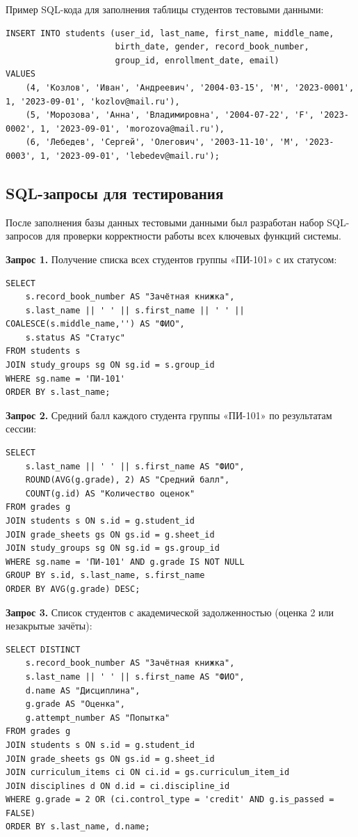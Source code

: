 \documentclass[14pt, a4paper]{extreport}
\begin{document}
Пример SQL-кода для заполнения таблицы студентов тестовыми данными:
\begin{lstlisting}[caption={Заполнение таблицы students тестовыми данными}]
INSERT INTO students (user_id, last_name, first_name, middle_name, 
                      birth_date, gender, record_book_number, 
                      group_id, enrollment_date, email)
VALUES 
    (4, 'Козлов', 'Иван', 'Андреевич', '2004-03-15', 'M', '2023-0001', 1, '2023-09-01', 'kozlov@mail.ru'),
    (5, 'Морозова', 'Анна', 'Владимировна', '2004-07-22', 'F', '2023-0002', 1, '2023-09-01', 'morozova@mail.ru'),
    (6, 'Лебедев', 'Сергей', 'Олегович', '2003-11-10', 'M', '2023-0003', 1, '2023-09-01', 'lebedev@mail.ru');
\end{lstlisting}

\subsection{SQL-запросы для тестирования}
После заполнения базы данных тестовыми данными был разработан набор SQL-запросов для проверки корректности работы всех ключевых функций системы.

\textbf{Запрос 1.} Получение списка всех студентов группы «ПИ-101» с их статусом:
\begin{lstlisting}[caption={Запрос 1: Список студентов группы}]
SELECT 
    s.record_book_number AS "Зачётная книжка",
    s.last_name || ' ' || s.first_name || ' ' || COALESCE(s.middle_name,'') AS "ФИО",
    s.status AS "Статус"
FROM students s
JOIN study_groups sg ON sg.id = s.group_id
WHERE sg.name = 'ПИ-101'
ORDER BY s.last_name;
\end{lstlisting}

\textbf{Запрос 2.} Средний балл каждого студента группы «ПИ-101» по результатам сессии:
\begin{lstlisting}[caption={Запрос 2: Средний балл студентов}]
SELECT 
    s.last_name || ' ' || s.first_name AS "ФИО",
    ROUND(AVG(g.grade), 2) AS "Средний балл",
    COUNT(g.id) AS "Количество оценок"
FROM grades g
JOIN students s ON s.id = g.student_id
JOIN grade_sheets gs ON gs.id = g.sheet_id
JOIN study_groups sg ON sg.id = gs.group_id
WHERE sg.name = 'ПИ-101' AND g.grade IS NOT NULL
GROUP BY s.id, s.last_name, s.first_name
ORDER BY AVG(g.grade) DESC;
\end{lstlisting}

\textbf{Запрос 3.} Список студентов с академической задолженностью (оценка 2 или незакрытые зачёты):
\begin{lstlisting}[caption={Запрос 3: Академическая задолженность}]
SELECT DISTINCT 
    s.record_book_number AS "Зачётная книжка",
    s.last_name || ' ' || s.first_name AS "ФИО",
    d.name AS "Дисциплина",
    g.grade AS "Оценка",
    g.attempt_number AS "Попытка"
FROM grades g
JOIN students s ON s.id = g.student_id
JOIN grade_sheets gs ON gs.id = g.sheet_id
JOIN curriculum_items ci ON ci.id = gs.curriculum_item_id
JOIN disciplines d ON d.id = ci.discipline_id
WHERE g.grade = 2 OR (ci.control_type = 'credit' AND g.is_passed = FALSE)
ORDER BY s.last_name, d.name;
\end{lstlisting}
\end{document}
